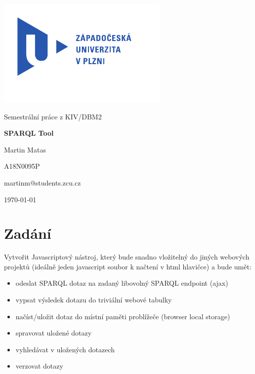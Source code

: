 \documentclass[
12pt,
a4paper,
pdftex,
czech,
titlepage
]{article}
\begin{document}
\begin{titlepage}
	\vspace*{-2cm}
	{\centering\includegraphics[scale=1.0]{logo.pdf}\par}
	\centering
	\vspace*{2cm}
	{\Large Semestrální práce z KIV/DBM2\par}
	\vspace{1.5cm}
	{\Huge\bfseries SPARQL Tool\par}
	\vspace{2cm}

	{\Large Martin Matas\par}
	{\Large A18N0095P\par}
	{\Large martinm@students.zcu.cz\par}

	\vfill

	{\Large \today}
\end{titlepage}

\tableofcontents
\thispagestyle{empty}
\clearpage

\section{Zadání}
\setcounter{page}{1}

Vytvořit Javascriptový nástroj, který bude snadno vložitelný do jiných
webových projektů (ideálně jeden javascript soubor k načtení v html
hlavičce) a bude umět:

\begin{itemize}
\item
  odeslat SPARQL dotaz na zadaný libovolný SPARQL endpoint (ajax)
\item
  vypsat výsledek dotazu do triviální webové tabulky
\item
  načíst/uložit dotaz do místní paměti problížeče (browser local
  storage)
\item
  spravovat uložené dotazy
\item
  vyhledávat v uložených dotazech
\item
  verzovat dotazy
\end{itemize}
\end{document}
